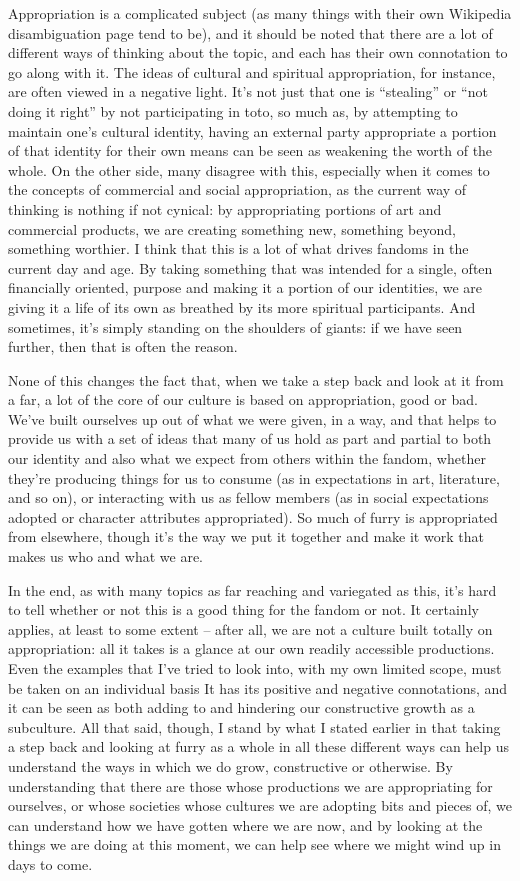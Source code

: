 Appropriation is a complicated subject (as many things with their own Wikipedia disambiguation page tend to be), and it should be noted that there are a lot of different ways of thinking about the topic, and each has their own connotation to go along with it. The ideas of cultural and spiritual appropriation, for instance, are often viewed in a negative light. It's not just that one is ``stealing'' or ``not doing it right'' by not participating in toto, so much as, by attempting to maintain one's cultural identity, having an external party appropriate a portion of that identity for their own means can be seen as weakening the worth of the whole. On the other side, many disagree with this, especially when it comes to the concepts of commercial and social appropriation, as the current way of thinking is nothing if not cynical: by appropriating portions of art and commercial products, we are creating something new, something beyond, something worthier. I think that this is a lot of what drives fandoms in the current day and age. By taking something that was intended for a single, often financially oriented, purpose and making it a portion of our identities, we are giving it a life of its own as breathed by its more spiritual participants. And sometimes, it's simply standing on the shoulders of giants: if we have seen further, then that is often the reason.

None of this changes the fact that, when we take a step back and look at it from a far, a lot of the core of our culture is based on appropriation, good or bad.  We've built ourselves up out of what we were given, in a way, and that helps to provide us with a set of ideas that many of us hold as part and partial to both our identity and also what we expect from others within the fandom, whether they're producing things for us to consume (as in expectations in art, literature, and so on), or interacting with us as fellow members (as in social expectations adopted or character attributes appropriated). So much of furry is appropriated from elsewhere, though it's the way we put it together and make it work that makes us who and what we are.

In the end, as with many topics as far reaching and variegated as this, it's hard to tell whether or not this is a good thing for the fandom or not. It certainly applies, at least to some extent -- after all, we are not a culture built totally on appropriation: all it takes is a glance at our own readily accessible productions. Even the examples that I've tried to look into, with my own limited scope, must be taken on an individual basis It has its positive and negative connotations, and it can be seen as both adding to and hindering our constructive growth as a subculture. All that said, though, I stand by what I stated earlier in that taking a step back and looking at furry as a whole in all these different ways can help us understand the ways in which we do grow, constructive or otherwise. By understanding that there are those whose productions we are appropriating for ourselves, or whose societies whose cultures we are adopting bits and pieces of, we can understand how we have gotten where we are now, and by looking at the things we are doing at this moment, we can help see where we might wind up in days to come.

